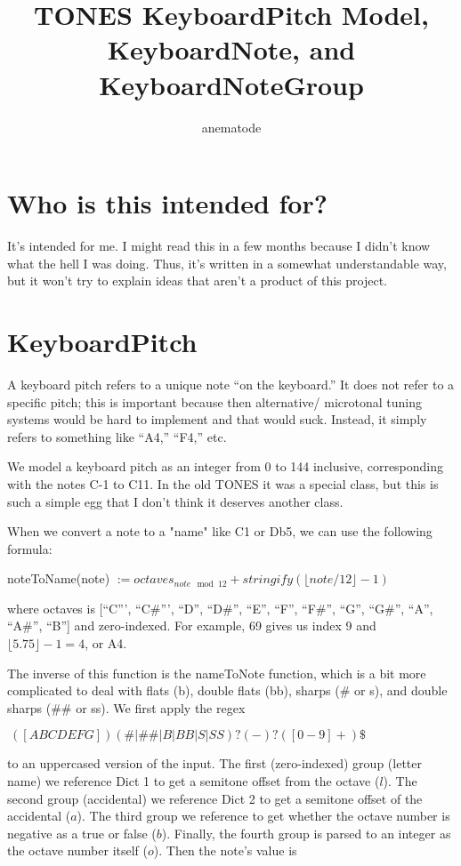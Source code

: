 \documentclass{article}
\begin{document}
\title{TONES KeyboardPitch Model, KeyboardNote, and KeyboardNoteGroup}

\author{anematode}

\maketitle

\section{Who is this intended for?}

It's intended for me. I might read this in a few months because I didn't know what the hell I was doing. Thus, it's written in a somewhat understandable way, but it won't try to explain ideas that aren't a product of this project.

\section{KeyboardPitch}

A keyboard pitch refers to a unique note ``on the keyboard.'' It does not refer to a specific pitch; this is important because then alternative/ microtonal tuning systems would be hard to implement and that would suck. Instead, it simply refers to something like ``A4,'' ``F4,'' etc.

We model a keyboard pitch as an integer from 0 to 144 inclusive, corresponding with the notes C-1 to C11. In the old TONES it was a special class, but this is such a simple egg that I don't think it deserves another class.

When we convert a note to a "name" like C1 or Db5, we can use the following formula:

noteToName(note) $:=octaves_{note\mod 12} + stringify(\lfloor note / 12\rfloor - 1)$

where octaves is [``C''', ``C\#''', ``D'', ``D\#'', ``E'', ``F'', ``F\#'', ``G'', ``G\#'', ``A'', ``A\#'', ``B''] and zero-indexed. For example, 69 gives us index 9 and $\lfloor 5.75 \rfloor - 1 = 4$, or A4.

The inverse of this function is the nameToNote function, which is a bit more complicated to deal with flats (b), double flats (bb), sharps (\# or s), and double sharps (\#\# or ss). We first apply the regex

$\widehat{}\:([ABCDEFG])(\#|\#\#|B|BB|S|SS)?(-)?([0-9]+)\$$

to an uppercased version of the input. The first (zero-indexed) group (letter name) we reference Dict 1 to get a semitone offset from the octave ($l$). The second group (accidental) we reference Dict 2 to get a semitone offset of the accidental ($a$). The third group we reference to get whether the octave number is negative as a true or false ($b$). Finally, the fourth group is parsed to an integer as the octave number itself ($o$). Then the note's value is
\end{document}
